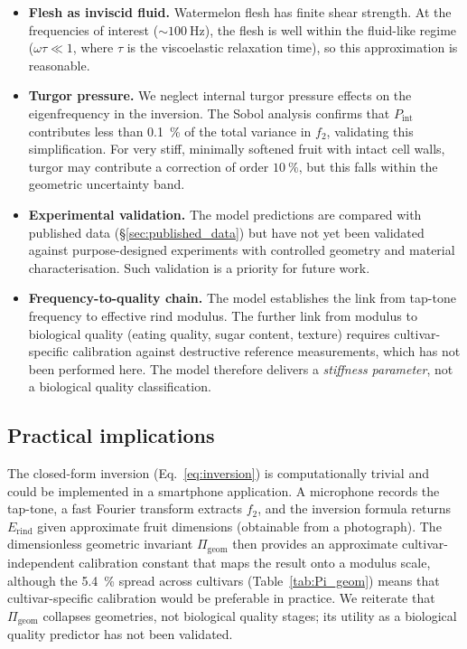 \begin{itemize}
  \item \textbf{Flesh as inviscid fluid.}  Watermelon flesh has finite
    shear strength.  At the frequencies of interest
    ($\sim\SI{100}{\hertz}$), the flesh is well within the
    fluid-like regime ($\omega \tau \ll 1$, where $\tau$ is the
    viscoelastic relaxation time), so this approximation is reasonable.

  \item \textbf{Turgor pressure.}  We neglect internal turgor pressure
    effects on the eigenfrequency in the inversion.  The Sobol analysis
    confirms that $P_{\mathrm{int}}$ contributes less than
    \SI{0.1}{\percent} of the total variance in $f_2$, validating this
    simplification.  For very stiff, minimally softened fruit with intact cell walls,
    turgor may contribute a correction of order $\SI{10}{\percent}$,
    but this falls within the geometric uncertainty band.

  \item \textbf{Experimental validation.}  The model predictions are
    compared with published data (\S\ref{sec:published_data}) but have
    not yet been validated against purpose-designed experiments with
    controlled geometry and material characterisation.  Such validation
    is a priority for future work.

  \item \textbf{Frequency-to-quality chain.}  The model establishes
    the link from tap-tone frequency to effective rind modulus.  The
    further link from modulus to biological quality (eating quality,
    sugar content, texture) requires cultivar-specific calibration
    against destructive reference measurements, which has not been
    performed here.  The model therefore delivers a \emph{stiffness
    parameter}, not a biological quality classification.
\end{itemize}

\subsection{Practical implications}
\label{sec:practical}

The closed-form inversion (Eq.~\ref{eq:inversion}) is computationally
trivial and could be implemented in a smartphone application.  A
microphone records the tap-tone, a fast Fourier transform extracts
$f_2$, and the inversion formula returns $E_{\mathrm{rind}}$ given
approximate fruit dimensions (obtainable from a photograph).  The
dimensionless geometric invariant $\Pi_{\mathrm{geom}}$ then provides
an approximate cultivar-independent calibration constant that maps the
result onto a modulus scale, although the \SI{5.4}{\percent} spread
across cultivars (Table~\ref{tab:Pi_geom}) means that cultivar-specific
calibration would be preferable in practice.  We reiterate that
$\Pi_{\mathrm{geom}}$ collapses geometries, not biological quality stages;
its utility as a biological quality predictor has not been validated.

